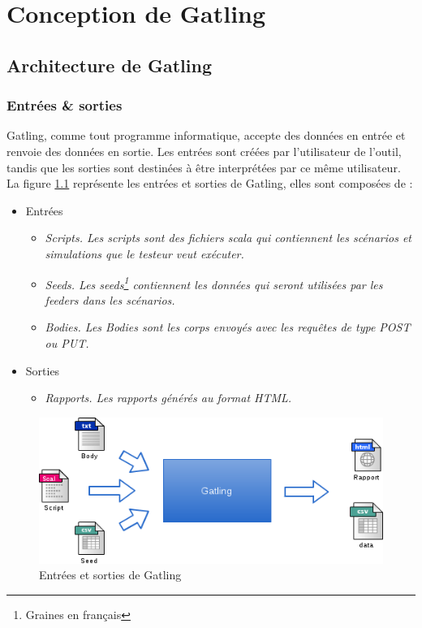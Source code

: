 \chapter{Conception de Gatling}
\section{Architecture de Gatling}
\subsection{Entrées \& sorties}
Gatling, comme tout programme informatique, accepte des données en entrée et renvoie des données en sortie. Les entrées sont créées par l'utilisateur de l'outil, tandis que les sorties sont destinées à être interprétées par ce même utilisateur. La figure \ref{io} représente les entrées et sorties de Gatling, elles sont composées de :

\begin{itemize}
  \item Entrées
  \begin{itemize}
	\item \em{Scripts}. Les scripts sont des fichiers scala qui contiennent les scénarios et simulations que le testeur veut exécuter.
  	\item \em{Seeds}. Les seeds\footnote{Graines en français} contiennent les données qui seront utilisées par les feeders dans les scénarios.
  	\item \em{Bodies}. Les Bodies sont les corps envoyés avec les requêtes de type POST ou PUT.
  \end{itemize}
  \item Sorties
  \begin{itemize}
    \item \em{Rapports}. Les rapports générés au format HTML.
  \end{itemize}
\end{itemize}

\begin{figure}[h]
\begin{center}
\includegraphics[width=400pt]{img/io.png}
\end{center}
\caption{Entrées et sorties de Gatling}
\label{io}
\end{figure}

